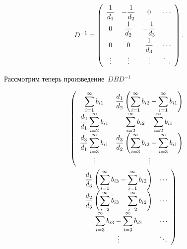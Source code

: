\begin{multicols}{2}
\noindent
\begin{equation*}
D^{-1}= \left(
\begin{array}{cccc}
\displaystyle\frac{\displaystyle 1\mathstrut}{\displaystyle d_{1}\mathstrut}   & \displaystyle -\displaystyle\frac{\displaystyle 1\mathstrut}{\displaystyle d_{2}\mathstrut}  & 0                  &   \cdots  \\
0                 & \displaystyle  \displaystyle\frac{\displaystyle 1\mathstrut}{\displaystyle d_{2}\mathstrut}  &\displaystyle  -\displaystyle\frac{\displaystyle 1\mathstrut}{\displaystyle d_{3}\mathstrut}   &   \cdots  \\
0                 &  0                &  \displaystyle \displaystyle\frac{\displaystyle 1\mathstrut}{\displaystyle d_{3}\mathstrut}   &   \cdots  \\
\vdots  & \vdots & \vdots  &   \ddots  \\
\end{array}
\right). 
\end{equation*}

\noindent Рассмотрим теперь произведение~$DBD^{-1}$

\vspace*{-2pt}

\noindent
\begin{multline*}
\left(
\begin{array}{cc}
\displaystyle \sum\limits_{i=1}^{\infty} b_{i1}   & \displaystyle
\displaystyle\frac{\displaystyle d_1\mathstrut}{\displaystyle d_{2}\mathstrut} \left( \sum\limits_{i=1}^{\infty} 
b_{i2} - \sum\limits_{i=1}^{\infty} b_{i1} \right)  \\
\displaystyle\displaystyle\frac{\displaystyle d_2\mathstrut}{\displaystyle d_{1}\mathstrut}  \sum\limits_{i=2}^{\infty} b_{i1}                &  
\displaystyle\sum\limits_{i=2}^{\infty} b_{i2} - \sum\limits_{i=2}^{\infty} b_{i1}\\
\displaystyle\displaystyle\frac{\displaystyle d_3\mathstrut}{\displaystyle d_{1}\mathstrut}  \sum\limits_{i=3}^{\infty} b_{i1}               &  
\displaystyle\displaystyle\frac{\displaystyle d_3\mathstrut}{\displaystyle d_{2}\mathstrut} \left( \sum\limits_{i=3}^{\infty} b_{i2} - \sum\limits_{i=3}^{\infty} 
b_{i1} \right)\\
\vdots  & \vdots                
\end{array}
\right. \\
\left.
\begin{array}{cc}
 \displaystyle\displaystyle\frac{\displaystyle d_1\mathstrut}{\displaystyle d_{3}\mathstrut} \left( 
\sum\limits_{i=1}^{\infty} b_{i3} - \sum\limits_{i=1}^{\infty} b_{i2}\right)                 &   
\cdots  \\
\displaystyle\displaystyle\frac{\displaystyle d_2\mathstrut}{\displaystyle d_{3}\mathstrut} \left( \sum\limits_{i=2}^{\infty} b_{i3} - \sum\limits_{i=2}^{\infty} 
b_{i2}\right)   &   \cdots  \\
\displaystyle\sum\limits_{i=3}^{\infty} b_{i3} - \sum\limits_{i=3}^{\infty} b_{i2}   &   \cdots  \\
 \vdots  &   \ddots  \\
\end{array}
\right)
\end{multline*}



\end{multicols}
